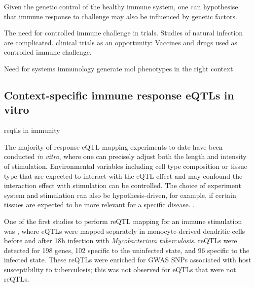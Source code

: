 \begin{outline}
    Given the genetic control of the healthy immune system, one can hypothesise that immune response to challenge may also be influenced by genetic factors.

    The need for controlled immune challenge in trials.
    Studies of natural infection are complicated.
    clinical trials as an opportunity: 
        Vaccines and drugs used as controlled immune challenge.

Need for systems immunology
    generate mol phenotypes 
    in the right context

\subsection{Context-specific immune response eQTLs in vitro}


reqtls in immunity

The majority of response eQTL mapping experiments to date have been conducted \textit{in vitro}, where one can precisely adjust both the length and intensity of stimulation.
Environmental variables including cell type composition or tissue type that are expected to interact with the eQTL effect and may confound the interaction effect with stimulation can be controlled.
The choice of experiment system and stimulation can also be hypothesis-driven, for example, if certain tissues are expected to be more relevant for a specific disease. 
.

One of the first studies to perform \gls{reQTL} mapping for an immune stimulation was \autocite{barreiro2012DecipheringGeneticArchitecture}, where eQTLs were mapped separately in monocyte-derived dendritic cells before and after 18h infection with \textit{Mycobacterium tuberculosis}.
reQTLs were detected for 198 genes, 102 specific to the uninfected state, and 96 specific to the infected state. 
These reQTLs were enriched for GWAS SNPs associated with host susceptibility to tuberculosis; this was not observed for eQTLs that were not reQTLs.


\end{outline}
